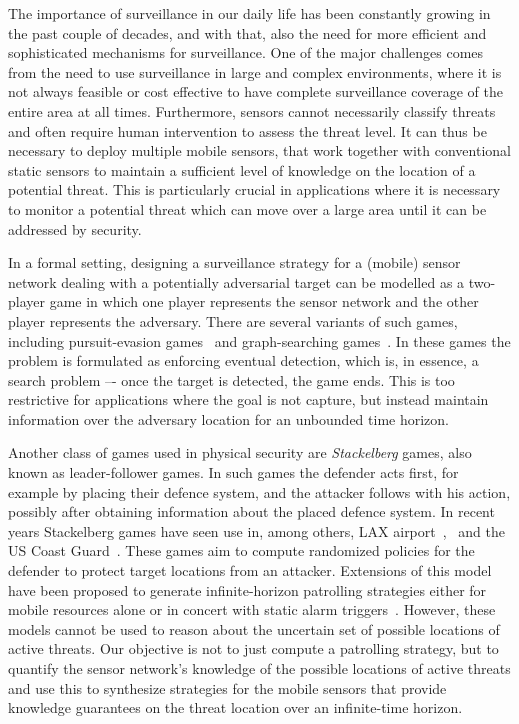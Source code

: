 The importance of surveillance in our daily life has been constantly growing in the past couple of decades, and with that, also the need for more efficient and sophisticated mechanisms for surveillance. One of the major challenges comes from the need to use surveillance in large and complex environments, where it is not always feasible or cost effective to have complete surveillance coverage of the entire area at all times. Furthermore, sensors cannot necessarily classify threats and often require human intervention to assess the threat level. It can thus be necessary to deploy multiple mobile sensors, that work together with conventional static sensors to maintain a sufficient level of knowledge on the location of a potential threat. This is particularly crucial in applications where it is necessary to monitor a potential threat which can move over a large area until it can be addressed by security.

In a formal setting, designing a surveillance strategy for a (mobile) sensor network dealing with a potentially adversarial target can be modelled as a two-player game in which one player represents the sensor network and the other player represents the adversary. There are several variants of such games, including pursuit-evasion games~\cite{Chung2011} and graph-searching games~\cite{Kreutzer11}. In these games the problem is formulated as enforcing eventual detection, which is, in essence, a search problem –- once the target is detected, the game ends. This is too restrictive for applications where the goal is not capture, but instead maintain information over the adversary location for an unbounded time horizon.

Another class of games used in physical security are \emph{Stackelberg} games, also known as leader-follower games. In such games the defender acts first, for example by placing their defence system, and the attacker follows with his action, possibly after obtaining information about the placed defence system. In recent years Stackelberg games have seen use in, among others, LAX airport~\cite{Pita08},~\cite{jain2012overview} and the US Coast Guard~\cite{An11}. These games aim to compute randomized policies for the defender to protect target locations from an attacker. Extensions of this model~\cite{Basilico12} have been proposed to generate infinite-horizon patrolling strategies either for mobile resources alone or in concert with static alarm triggers~\cite{basilico2016security,Munoz13}. However, these models cannot be used to reason about the uncertain set of possible  locations of active threats. Our objective is not to just compute a patrolling strategy, but to quantify the sensor network's knowledge of the possible locations of active threats and use this to synthesize strategies for the mobile sensors that provide knowledge guarantees on the threat location over an infinite-time horizon.


